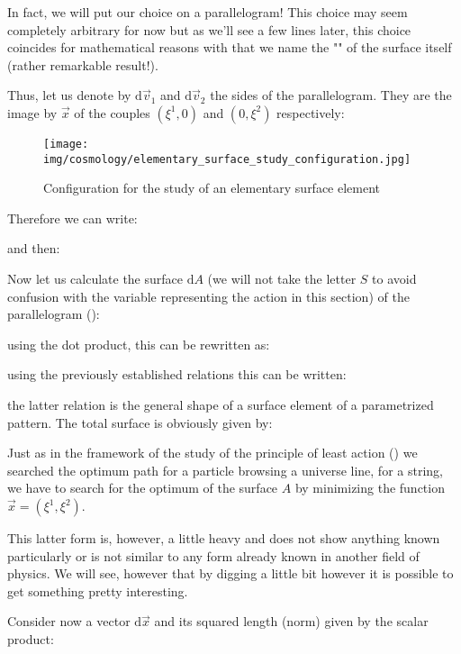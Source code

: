 	In fact, we will put our choice on a parallelogram! This choice may seem completely arbitrary for now but as we'll see a few lines later, this choice coincides for mathematical reasons with that we name the "" of the surface itself (rather remarkable result!).
	
	Thus, let us denote by $\mathrm{d}\vec{v}_1$ and $\mathrm{d}\vec{v}_2$ the sides of the parallelogram. They are the image by $\vec{x}$ of the couples $(\xi^1,0)$ and $(0,\xi^2)$ respectively:
	\begin{figure}[H]
		\centering
		\texttt{[image: img/cosmology/elementary\_surface\_study\_configuration.jpg]}	
		\caption{Configuration for the study of an elementary surface element}
	\end{figure}
	Therefore we can write:
	
	and then:
	
	Now let us calculate the surface $\mathrm{d}A$ (we will not take the letter $S$ to avoid confusion with the variable representing the action in this section) of the parallelogram ():
	
	using the dot product, this can be rewritten as:
	
	using the previously established relations this can be written:
	
	the latter relation is the general shape of a surface element of a parametrized pattern. The total surface is obviously given by:
	
	Just as in the framework of the study of the principle of least action () we searched the optimum path for a particle browsing a universe line, for a string, we have to search for the optimum of the surface $A$ by minimizing the function $\vec{x}=\left(\xi^1,\xi^2\right)$.
	
	This latter form is, however, a little heavy and does not show anything known particularly or is not similar to any form already known in another field of physics. We will see, however that by digging a little bit however it is possible to get something pretty interesting.
	
	Consider now a vector $\mathrm{d}\vec{x}$ and its squared length (norm) given by the scalar product:
	
